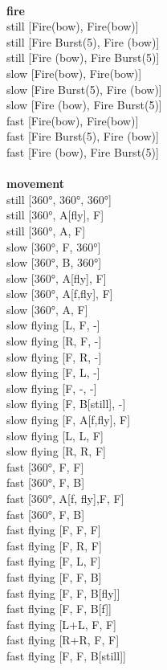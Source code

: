 \ \\ {\bf fire } \\
still [Fire(bow), Fire(bow)] \\
still [Fire Burst(5), Fire (bow)] \\
still [Fire (bow), Fire Burst(5)] \\
slow [Fire(bow), Fire(bow)] \\
slow [Fire Burst(5), Fire (bow)] \\
slow [Fire (bow), Fire Burst(5)] \\
fast [Fire(bow), Fire(bow)] \\
fast [Fire Burst(5), Fire (bow)] \\
fast [Fire (bow), Fire Burst(5)] \\
\ \\ {\bf movement } \\
still [360°, 360°, 360°] \\
still [360°, A[fly], F] \\
still [360°, A, F] \\
slow [360°, F, 360°] \\
slow [360°, B, 360°] \\
slow [360°, A[fly], F] \\
slow [360°, A[f,fly], F] \\
slow [360°, A, F] \\
slow flying [L, F, -] \\
slow flying [R, F, -] \\
slow flying [F, R, -] \\
slow flying [F, L, -] \\
slow flying [F, -, -] \\
slow flying [F, B[still], -] \\
slow flying [F, A[f,fly], F] \\
slow flying [L, L, F] \\
slow flying [R, R, F] \\
fast [360°, F, F] \\
fast [360°, F, B] \\
fast [360°, A[f, fly],F, F] \\
fast [360°, F, B] \\
fast flying [F, F, F] \\
fast flying [F, R, F] \\
fast flying [F, L, F] \\
fast flying [F, F, B] \\
fast flying [F, F, B[fly]] \\
fast flying [F, F, B[f]] \\
fast flying [L+L, F, F] \\
fast flying [R+R, F, F] \\
fast flying [F, F, B[still]] \\


